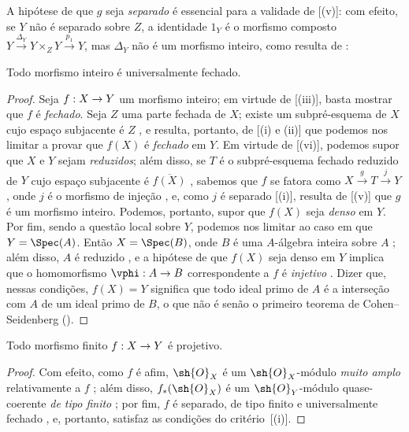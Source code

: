 \documentclass[oneside,10pt]{amsart}
\makeatletter
\newcommand{\ega@arrow}[2]{\mathchoice{#1}{#2}{#2}{#2}}
\renewcommand{\to}{\ega@arrow{\longrightarrow}{\rightarrow}}
\newcommand{\oldpage}[2][]{\marginnote{\normalfont\footnotesize\textbf{#1}~|~#2}\ignorespaces}
\let\EGAOriginalLabel\label
\renewcommand{\label}[1]{\phantomsection\EGAOriginalLabel{#1}}
\makeatother
\begin{document}
\begin{remark}[6.1.9]
\label{II.6.1.9}
A hipótese de que $g$ seja \emph{separado} é essencial para a validade de [(v)]: com efeito, se $Y$ não é separado sobre $Z$, a identidade $1_Y$ é o morfismo composto $Y\xrightarrow{\Delta_Y}Y\times_Z Y\xrightarrow{p_1}Y$, mas $\Delta_Y$ não é um morfismo inteiro, como resulta de :
\end{remark}

\begin{proposition}[6.1.10]
\label{II.6.1.10}
Todo morfismo inteiro é universalmente fechado.
\end{proposition}

\begin{proof}
Seja $f:X\to Y$ um morfismo inteiro;
em virtude de [(iii)], basta mostrar que $f$ é \emph{fechado}.
Seja $Z$ uma parte fechada de $X$;
\oldpage[II]{113}
existe um subpré-esquema de $X$ cujo espaço subjacente é $Z$ , e resulta, portanto, de [(i) e (ii)] que podemos nos limitar a provar que $f(X)$ é \emph{fechado} em $Y$.
Em virtude de [(vi)], podemos supor que $X$ e $Y$ sejam \emph{reduzidos};
além disso, se $T$ é o subpré-esquema fechado reduzido de $Y$ cujo espaço subjacente é $\overline{f(X)}$ , sabemos que $f$ se fatora como $X\xrightarrow{g}T\xrightarrow{j}Y$, onde $j$ é o morfismo de injeção , e, como $j$ é separado [(i)], resulta de [(v)] que $g$ é um morfismo inteiro.
Podemos, portanto, supor que $f(X)$ seja \emph{denso} em $Y$.
Por fim, sendo a questão local sobre $Y$, podemos nos limitar ao caso em que $Y=\Spec(A)$.
Então $X=\Spec(B)$, onde $B$ é uma $A$-álgebra inteira sobre $A$ ;
além disso, $A$ é reduzido , e a hipótese de que $f(X)$ seja denso em $Y$ implica que o homomorfismo $\vphi:A\to B$ correspondente a $f$ é \emph{injetivo} .
Dizer que, nessas condições, $f(X)=Y$ significa que todo ideal primo de $A$ é a interseção com $A$ de um ideal primo de $B$, o que não é senão o primeiro teorema de Cohen--Seidenberg (\cite[t.~I, p.~257, th.~3]{I-13}).
\end{proof}

\begin{corollary}[6.1.11]
\label{II.6.1.11}
Todo morfismo finito $f:X\to Y$ é projetivo.
\end{corollary}

\begin{proof}
Com efeito, como $f$ é afim, $\sh{O}_X$ é um $\sh{O}_X$-módulo \emph{muito amplo} relativamente a $f$ ;
além disso, $f_*(\sh{O}_X)$ é um $\sh{O}_Y$-módulo quase-coerente \emph{de tipo finito} ;
por fim, $f$ é separado, de tipo finito e universalmente fechado , e, portanto, satisfaz as condições do critério~[(i)].
\end{proof}
\end{document}
